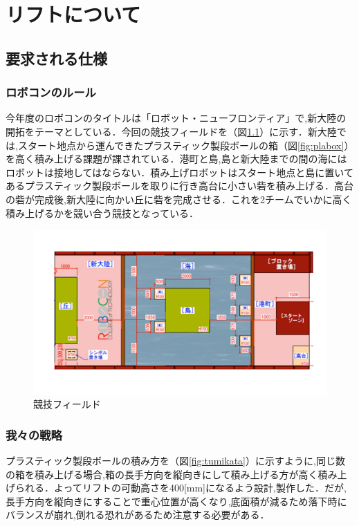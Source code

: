 \chapter{リフトについて}

\section{要求される仕様}
\subsection{ロボコンのルール}
今年度のロボコンのタイトルは「ロボット・ニューフロンティア」で,新大陸の開拓をテーマとしている．今回の競技フィールドを（図\ref{fig:field}）に示す．新大陸では,スタート地点から運んできたプラスティック製段ボールの箱（図\ref{fig:plabox}）を高く積み上げる課題が課されている．港町と島,島と新大陸までの間の海にはロボットは接地してはならない．積み上げロボットはスタート地点と島に置いてあるプラスティック製段ボールを取りに行き高台に小さい砦を積み上げる．高台の砦が完成後,新大陸に向かい丘に砦を完成させる．これを2チームでいかに高く積み上げるかを競い合う競技となっている．

\begin{figure}[htbp]
  \begin{center}
    \includegraphics[width=130mm]{img/field.png}
    \end{center}
  \caption{競技フィールド}
 \label{fig:field}
\end{figure}

\subsection{我々の戦略}
プラスティック製段ボールの積み方を（図\ref{fig:tumikata}）に示すように,同じ数の箱を積み上げる場合,箱の長手方向を縦向きにして積み上げる方が高く積み上げられる．よってリフトの可動高さを400[mm]になるよう設計,製作した．だが,長手方向を縦向きにすることで重心位置が高くなり,底面積が減るため落下時にバランスが崩れ,倒れる恐れがあるため注意する必要がある．


